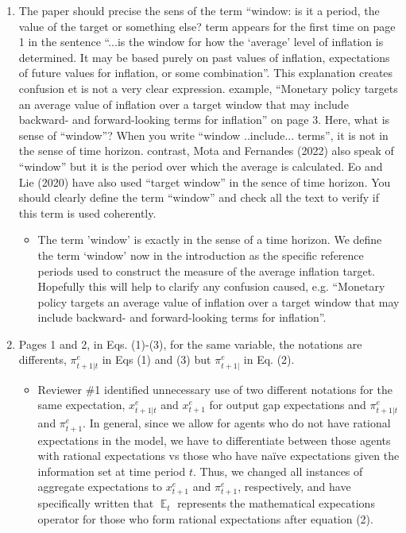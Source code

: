 \documentclass[english,authoryear,12pt]{elsarticle}
\DeclareMathOperator{\E}{\mathbb{E}}
\begin{document}
\begin{enumerate}
	\item The paper should precise the sens of the term “window: is it a period, the value of the target or something else? term appears for the first time on page 1 in the sentence “...is the window for how the ‘average’ level of inflation is determined. It may be based purely on past values of inflation, expectations of future values for inflation, or some combination”. This explanation creates confusion et is not a very clear expression. example, ``Monetary policy targets an average value of inflation over a target window that may include backward- and forward-looking terms for inflation” on page 3. Here, what is sense of “window”? When you write “window ..include... terms”, it is not in the sense of time horizon. contrast, Mota and Fernandes (2022) also speak of “window” but it is the period over which the average is calculated. Eo and Lie (2020) have also used “target window” in the sence of time horizon. You should clearly define the term “window” and check all the text to verify if this term is used coherently.
	\begin{itemize}
		\item The term 'window' is exactly in the sense of a time horizon. We define the term `window' now in the introduction as the specific reference periods used to construct the measure of the average inflation target. Hopefully this will help to clarify any confusion caused, e.g. ``Monetary policy targets an average value of inflation over a target window that may include backward- and forward-looking terms for inflation”. 
	\end{itemize}
	\item Pages 1 and 2, in Eqs. (1)-(3), for the same variable, the notations are differents, $\pi_{t+1|t}^{e}$ in Eqs (1) and (3) but $\pi_{t+1|}^{e}$ in Eq. (2).
	\begin{itemize}
		\item Reviewer \#1 identified unnecessary use of two different notations for the same expectation, $x^e_{t+1|t}$ and $x^e_{t+1}$ for output gap expectations and $\pi^e_{t+1|t}$ and $\pi^e_{t+1}$. In general, since we allow for agents who do not have rational expectations in the model, we have to differentiate between those agents with rational expectations vs those who have na\"ive expectations given the information set at time period $t$. Thus, we changed all instances of aggregate expectations to $x^e_{t+1}$ and $\pi^e_{t+1}$, respectively, and have specifically written that $\E_t$ represents the mathematical expecations operator for those who form rational expectations after equation (2).

\end{itemize}
\end{enumerate}
\end{document}
